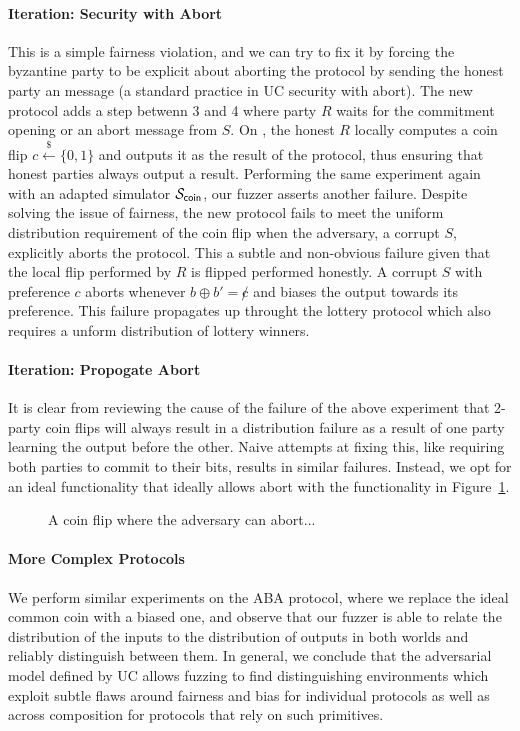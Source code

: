 \paragraph{Iteration: Security with Abort}
This is a simple fairness violation, and we can try to fix it by forcing the byzantine party to be explicit about aborting the protocol by sending the honest party an  message (a standard practice in UC security with abort).
The new protocol adds a step betwenn 3 and 4 where party $R$ waits for the commitment opening or an abort message from $S$. 
On , the honest $R$ locally computes a coin flip $c \xleftarrow{\$} \{0,1\}$ and outputs it as the result of the protocol, thus ensuring that honest parties always output a result.
Performing the same experiment again with an adapted simulator $\mathcal{S}_{{\mathsf {coin}}}$, our fuzzer asserts another failure. 
Despite solving the issue of fairness, the new protocol fails to meet the uniform distribution requirement of the coin flip when the adversary, a corrupt $S$, explicitly aborts the protocol.
This a subtle and non-obvious failure given that the local flip performed by $R$ is flipped performed honestly.
A corrupt $S$ with preference $c$ aborts whenever $b \oplus b' = \not c$ and biases the output towards its preference.
This failure propagates up throught the lottery protocol which also requires a unform distribution of lottery winners. 

\paragraph{Iteration: Propogate Abort}
It is clear from reviewing the cause of the failure of the above experiment that 2-party coin flips will always result in a distribution failure as a result of one party learning the output before the other.
Naive attempts at fixing this, like requiring both parties to commit to their bits, results in similar failures.
Instead, we opt for an ideal functionality that ideally allows abort with the functionality in Figure~\ref{fig:fcoinabort}.

\begin{figure}
\centering

\caption{A coin flip where the adversary can abort...}
\label{fig:fcoinabort}
\end{figure}



\paragraph{More Complex Protocols}
We perform similar experiments on the ABA protocol, where we replace the ideal common coin with a biased one, and observe that our fuzzer is able to relate the distribution of the inputs to the distribution of outputs in both worlds and reliably distinguish between them.
In general, we conclude that the adversarial model defined by UC allows fuzzing to find distinguishing environments which exploit subtle flaws around fairness and bias for individual protocols as well as across composition for protocols that rely on such primitives. 

